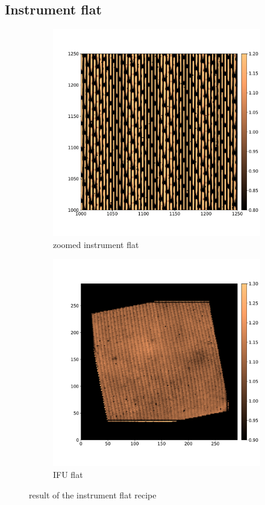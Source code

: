 \documentclass[twoside,single]{lion-msc}
\begin{document}
\subsection{Instrument flat}
\begin{figure}[!b]
\centering
\begin{subfigure}{.5\textwidth}
  \centering
  \includegraphics[width=1\linewidth]{instrumentflat}
  \caption{zoomed instrument flat}
\end{subfigure}%
\begin{subfigure}{.5\textwidth}
  \centering
  \includegraphics[width=1\linewidth]{IFU_flat}
  \caption{IFU flat}
\end{subfigure}
\caption{result of the instrument flat recipe}
\label{fig:instrumentflatrecipe}
\end{figure}
\end{document}
